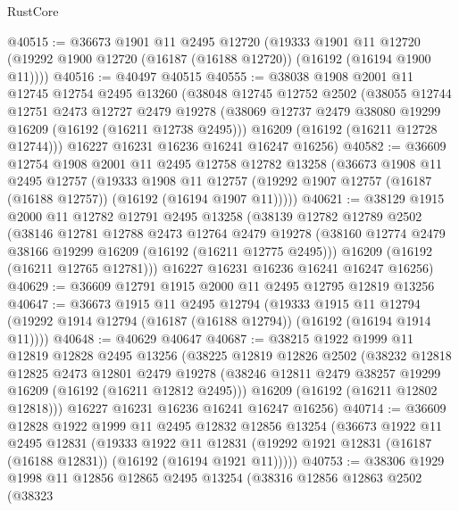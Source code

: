 \begin{lexlean}{RustCore}
\begin{coremodule}
@40515 := @36673
    @1901
    @11
    @2495
    @12720
    (@19333
      @1901
      @11
      @12720
      (@19292 @1900 @12720 (@16187 (@16188 @12720)) (@16192 (@16194 @1900 @11))))
@40516 := @40497 @40515
@40555 := @38038
    @1908
    @2001
    @11
    @12745
    @12754
    @2495
    @13260
    (@38048
      @12745
      @12752
      @2502
      (@38055
        @12744
        @12751
        @2473
        @12727
        @2479
        @19278
        (@38069 @12737 @2479 @38080 @19299 @16209 (@16192 (@16211 @12738 @2495)))
        @16209
        (@16192 (@16211 @12728 @12744)))
      @16227
      @16231
      @16236
      @16241
      @16247
      @16256)
@40582 := @36609
    @12754
    @1908
    @2001
    @11
    @2495
    @12758
    @12782
    @13258
    (@36673
      @1908
      @11
      @2495
      @12757
      (@19333
        @1908
        @11
        @12757
        (@19292 @1907 @12757 (@16187 (@16188 @12757)) (@16192 (@16194 @1907 @11)))))
@40621 := @38129
    @1915
    @2000
    @11
    @12782
    @12791
    @2495
    @13258
    (@38139
      @12782
      @12789
      @2502
      (@38146
        @12781
        @12788
        @2473
        @12764
        @2479
        @19278
        (@38160 @12774 @2479 @38166 @19299 @16209 (@16192 (@16211 @12775 @2495)))
        @16209
        (@16192 (@16211 @12765 @12781)))
      @16227
      @16231
      @16236
      @16241
      @16247
      @16256)
@40629 := @36609 @12791 @1915 @2000 @11 @2495 @12795 @12819 @13256
@40647 := @36673
    @1915
    @11
    @2495
    @12794
    (@19333
      @1915
      @11
      @12794
      (@19292 @1914 @12794 (@16187 (@16188 @12794)) (@16192 (@16194 @1914 @11))))
@40648 := @40629 @40647
@40687 := @38215
    @1922
    @1999
    @11
    @12819
    @12828
    @2495
    @13256
    (@38225
      @12819
      @12826
      @2502
      (@38232
        @12818
        @12825
        @2473
        @12801
        @2479
        @19278
        (@38246 @12811 @2479 @38257 @19299 @16209 (@16192 (@16211 @12812 @2495)))
        @16209
        (@16192 (@16211 @12802 @12818)))
      @16227
      @16231
      @16236
      @16241
      @16247
      @16256)
@40714 := @36609
    @12828
    @1922
    @1999
    @11
    @2495
    @12832
    @12856
    @13254
    (@36673
      @1922
      @11
      @2495
      @12831
      (@19333
        @1922
        @11
        @12831
        (@19292 @1921 @12831 (@16187 (@16188 @12831)) (@16192 (@16194 @1921 @11)))))
@40753 := @38306
    @1929
    @1998
    @11
    @12856
    @12865
    @2495
    @13254
    (@38316
      @12856
      @12863
      @2502
      (@38323

\end{coremodule}
\end{lexlean}
